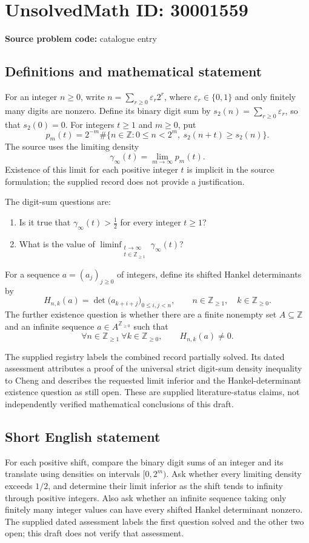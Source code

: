 \documentclass[11pt]{article}
\newcommand{\Z}{\mathbb{Z}}
\begin{document}
\section*{UnsolvedMath ID: 30001559}
\textbf{Source problem code:} catalogue entry
\subsection{Definitions and mathematical statement}
For an integer \(n\geq 0\), write \(n=\sum_{r\geq 0}\varepsilon_r2^r\), where \(\varepsilon_r\in\{0,1\}\) and only finitely many digits are nonzero. Define its binary digit sum by \(s_2(n)=\sum_{r\geq 0}\varepsilon_r\), so that \(s_2(0)=0\). For integers \(t\geq 1\) and \(m\geq 0\), put
\[
p_m(t)=2^{-m}\#\bigl\{n\in\Z:0\leq n<2^m,\ s_2(n+t)\geq s_2(n)\bigr\}.
\]
The source uses the limiting density
\[
\gamma_\infty(t)=\lim_{m\to\infty}p_m(t).
\]
Existence of this limit for each positive integer \(t\) is implicit in the source formulation; the supplied record does not provide a justification.

The digit-sum questions are:
\begin{enumerate}
\item Is it true that \(\gamma_\infty(t)>\tfrac12\) for every integer \(t\geq 1\)?
\item What is the value of \(\displaystyle\liminf_{\substack{t\to\infty\\t\in\Z_{\geq 1}}}\gamma_\infty(t)\)?
\end{enumerate}

For a sequence \(a=(a_j)_{j\geq 0}\) of integers, define its shifted Hankel determinants by
\[
H_{n,k}(a)=\det\bigl(a_{k+i+j}\bigr)_{0\leq i,j<n},
\qquad n\in\Z_{\geq 1},\quad k\in\Z_{\geq 0}.
\]
The further existence question is whether there are a finite nonempty set \(A\subseteq\Z\) and an infinite sequence \(a\in A^{\Z_{\geq 0}}\) such that
\[
\forall n\in\Z_{\geq 1}\ \forall k\in\Z_{\geq 0},\qquad H_{n,k}(a)\neq 0.
\]

The supplied registry labels the combined record partially solved. Its dated assessment attributes a proof of the universal strict digit-sum density inequality to Cheng and describes the requested limit inferior and the Hankel-determinant existence question as still open. These are supplied literature-status claims, not independently verified mathematical conclusions of this draft.
\subsection{Short English statement}
For each positive shift, compare the binary digit sums of an integer and its translate using densities on intervals \([0,2^m)\). Ask whether every limiting density exceeds \(1/2\), and determine their limit inferior as the shift tends to infinity through positive integers. Also ask whether an infinite sequence taking only finitely many integer values can have every shifted Hankel determinant nonzero. The supplied dated assessment labels the first question solved and the other two open; this draft does not verify that assessment.
\end{document}
